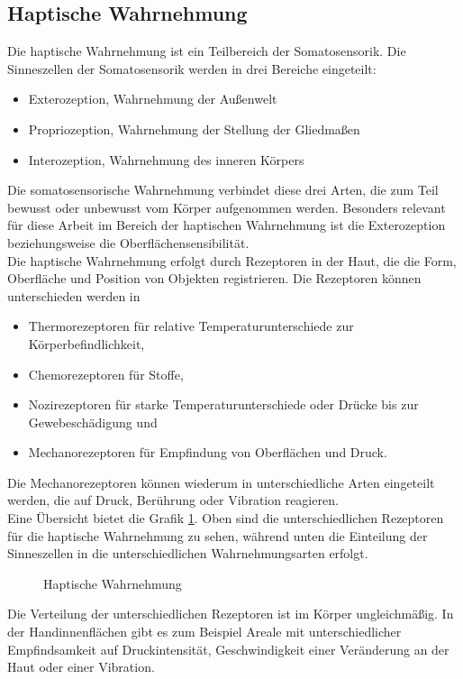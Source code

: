 \subsection{Haptische Wahrnehmung}
Die haptische Wahrnehmung ist ein Teilbereich der Somatosensorik. Die Sinneszellen der Somatosensorik werden in drei Bereiche eingeteilt:
\begin{itemize}
	\item Exterozeption, Wahrnehmung der Außenwelt
	\item Propriozeption, Wahrnehmung der Stellung der Gliedmaßen
	\item Interozeption, Wahrnehmung des inneren Körpers
\end{itemize}
Die somatosensorische Wahrnehmung verbindet diese drei Arten, die zum Teil bewusst oder unbewusst vom Körper aufgenommen werden. Besonders relevant für diese Arbeit im Bereich der haptischen Wahrnehmung ist die Exterozeption beziehungsweise die Oberflächensensibilität. \cite[Vgl. Seite 26]{Sprenger.2020}\\
Die haptische Wahrnehmung erfolgt durch Rezeptoren in der Haut, die die Form, Oberfläche und Position von Objekten registrieren. Die Rezeptoren können unterschieden werden in
\begin{itemize}
	\item Thermorezeptoren für relative Temperaturunterschiede zur Körperbefindlichkeit, 
	\item Chemorezeptoren für Stoffe,
	\item Nozirezeptoren für starke Temperaturunterschiede oder Drücke bis zur Gewebeschädigung und
	\item Mechanorezeptoren für Empfindung von Oberflächen und Druck.
\end{itemize}
Die Mechanorezeptoren können wiederum in unterschiedliche Arten eingeteilt werden, die auf Druck, Berührung oder Vibration reagieren. \cite[Vgl. Seite 26 f.]{Sprenger.2020} \\
Eine Übersicht bietet die Grafik \ref{fig:hapWahrnehmung}. Oben sind die unterschiedlichen Rezeptoren für die haptische Wahrnehmung zu sehen, während unten die Einteilung der Sinneszellen in die unterschiedlichen Wahrnehmungsarten erfolgt.
\begin{figure}[hbt]
	\centering
	
	\caption[Haptische Wahrnehmung]{Haptische Wahrnehmung}
	\label{fig:hapWahrnehmung}
\end{figure}
Die Verteilung der unterschiedlichen Rezeptoren ist im Körper ungleichmäßig. In der Handinnenflächen gibt es zum Beispiel Areale mit unterschiedlicher Empfindsamkeit \glqq auf Druckintensität, Geschwindigkeit einer Veränderung an der Haut oder einer Vibration.\grqq{} \cite[Seite 29]{Sprenger.2020}\\
